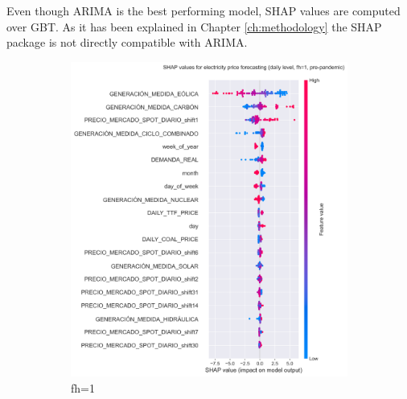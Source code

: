 Even though ARIMA is the best performing model, SHAP values are computed over GBT. As it has been explained in Chapter \ref{ch:methodology} the SHAP package is not directly compatible with ARIMA.

\begin{figure}[H]
\centering
    \begin{subfigure}{.45\textwidth}
        \centering
        \includegraphics[width=1\linewidth]{images/analysis/shap-daily-pre-1}
        \caption{fh=1}
    \end{subfigure}
    \begin{subfigure}{.45\textwidth}
        \centering

\end{subfigure}
\end{figure}
